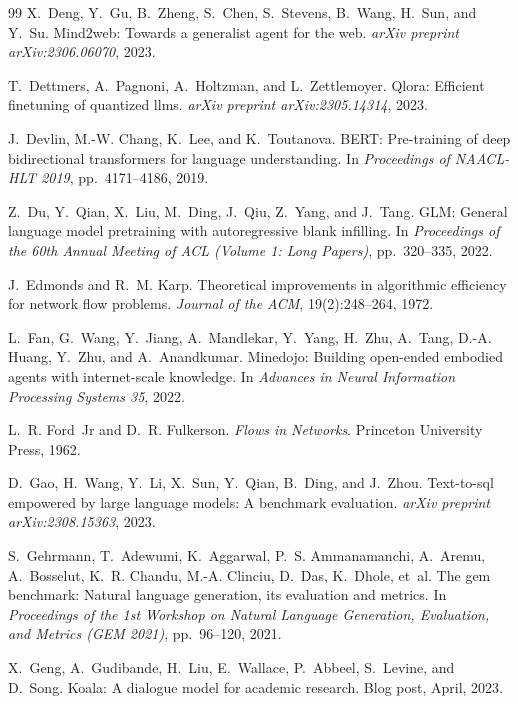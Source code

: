\begin{thebibliography}{99}
X.~Deng, Y.~Gu, B.~Zheng, S.~Chen, S.~Stevens, B.~Wang, H.~Sun, and Y.~Su.
\newblock Mind2web: Towards a generalist agent for the web.
\newblock \emph{arXiv preprint arXiv:2306.06070}, 2023.

T.~Dettmers, A.~Pagnoni, A.~Holtzman, and L.~Zettlemoyer.
\newblock Qlora: Efficient finetuning of quantized llms.
\newblock \emph{arXiv preprint arXiv:2305.14314}, 2023.

J.~Devlin, M.-W. Chang, K.~Lee, and K.~Toutanova.
\newblock BERT: Pre-training of deep bidirectional transformers for
language understanding.
\newblock In \emph{Proceedings of NAACL-HLT 2019}, pp.\ 4171--4186, 2019.

Z.~Du, Y.~Qian, X.~Liu, M.~Ding, J.~Qiu, Z.~Yang, and J.~Tang.
\newblock GLM: General language model pretraining with autoregressive blank
infilling.
\newblock In \emph{Proceedings of the 60th Annual Meeting of ACL (Volume 1:
Long Papers)}, pp.\ 320--335, 2022.

J.~Edmonds and R.~M. Karp.
\newblock Theoretical improvements in algorithmic efficiency for network
flow problems.
\newblock \emph{Journal of the ACM}, 19(2):248--264, 1972.

L.~Fan, G.~Wang, Y.~Jiang, A.~Mandlekar, Y.~Yang, H.~Zhu, A.~Tang,
D.-A. Huang, Y.~Zhu, and A.~Anandkumar.
\newblock Minedojo: Building open-ended embodied agents with
internet-scale knowledge.
\newblock In \emph{Advances in Neural Information Processing Systems 35},
2022.

L.~R. Ford~Jr and D.~R. Fulkerson.
\newblock \emph{Flows in Networks}.
\newblock Princeton University Press, 1962.

D.~Gao, H.~Wang, Y.~Li, X.~Sun, Y.~Qian, B.~Ding, and J.~Zhou.
\newblock Text-to-sql empowered by large language models: A benchmark
evaluation.
\newblock \emph{arXiv preprint arXiv:2308.15363}, 2023.

S.~Gehrmann, T.~Adewumi, K.~Aggarwal, P.~S. Ammanamanchi, A.~Aremu,
A.~Bosselut, K.~R. Chandu, M.-A. Clinciu, D.~Das, K.~Dhole, et~al.
\newblock The gem benchmark: Natural language generation, its evaluation
and metrics.
\newblock In \emph{Proceedings of the 1st Workshop on Natural Language
Generation, Evaluation, and Metrics (GEM 2021)}, pp.\ 96--120, 2021.

X.~Geng, A.~Gudibande, H.~Liu, E.~Wallace, P.~Abbeel, S.~Levine, and
D.~Song.
\newblock Koala: A dialogue model for academic research.
\newblock Blog post, April, 2023.


\end{thebibliography}

